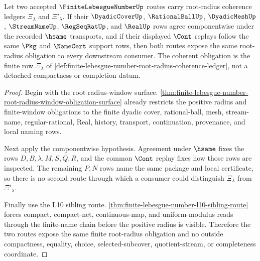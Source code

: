\begin{theorem}
\label{thm:finite-lebesgue-number-root-radius-coherence}
Let two accepted $\FiniteLebesgueNumberUp$ routes carry root-radius coherence ledgers $\Xi_{\lambda}$ and $\Xi'_{\lambda}$. If their $\DyadicCoverUp$, $\RationalBallUp$, $\DyadicMeshUp$, $\StreamNameUp$, $\RegSeqRatUp$, and $\RealUp$ rows agree componentwise under the recorded $\hsame$ transports, and if their displayed $\Cont$ replays follow the same $\Pkg$ and $\NameCert$ support rows, then both routes expose the same root-radius obligation to every downstream consumer. The coherent obligation is the finite row $\Xi_{\lambda}$ of \autoref{def:finite-lebesgue-number-root-radius-coherence-ledger}, not a detached compactness or completion datum.
\end{theorem}
\begin{proof}
Begin with the root radius-window surface. \autoref{thm:finite-lebesgue-number-root-radius-window-obligation-surface} already restricts the positive radius and finite-window obligations to the finite dyadic cover, rational-ball, mesh, stream-name, regular-rational, Real, history, transport, continuation, provenance, and local naming rows.

Next apply the componentwise hypothesis. Agreement under $\hsame$ fixes the rows $D,B,\lambda,M,S,Q,R$, and the common $\Cont$ replay fixes how those rows are inspected. The remaining $P,N$ rows name the same package and local certificate, so there is no second route through which a consumer could distinguish $\Xi_{\lambda}$ from $\Xi'_{\lambda}$.

Finally use the L10 sibling route. \autoref{thm:finite-lebesgue-number-l10-sibling-route} forces compact, compact-net, continuous-map, and uniform-modulus reads through the finite-name chain before the positive radius is visible. Therefore the two routes expose the same finite root-radius obligation and no outside compactness, equality, choice, selected-subcover, quotient-stream, or completeness coordinate.
\end{proof}

